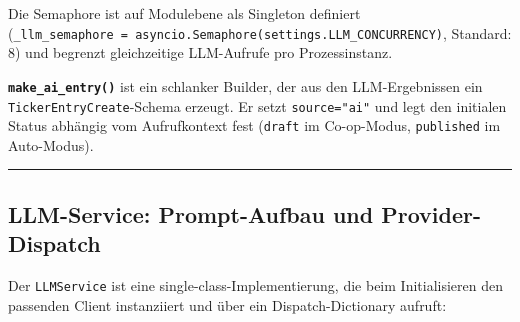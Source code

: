 \begin{Shaded}
\begin{Highlighting}[]
 
     
\OperatorTok{=}
\OperatorTok{=}
\NormalTok{    )}
\end{Highlighting}
\end{Shaded}

Die Semaphore ist auf Modulebene als Singleton definiert
(\texttt{\_llm\_semaphore\ =\ asyncio.Semaphore(settings.LLM\_CONCURRENCY)},
Standard: 8) und begrenzt gleichzeitige LLM-Aufrufe pro Prozessinstanz.

\textbf{\texttt{make\_ai\_entry()}} ist ein schlanker Builder, der aus
den LLM-Ergebnissen ein \texttt{TickerEntryCreate}-Schema erzeugt. Er
setzt \texttt{source="ai"} und legt den initialen Status abhängig vom
Aufrufkontext fest (\texttt{draft} im Co-op-Modus, \texttt{published} im
Auto-Modus).

\begin{center}\rule{0.5\linewidth}{0.5pt}\end{center}

\subsection{LLM-Service: Prompt-Aufbau und
Provider-Dispatch}\label{llm-service-prompt-aufbau-und-provider-dispatch}

Der \texttt{LLMService} ist eine single-class-Implementierung, die beim
Initialisieren den passenden Client instanziiert und über ein
Dispatch-Dictionary aufruft:

\begin{Shaded}
\begin{Highlighting}[]
\OperatorTok{=}\NormalTok{ \{}
    \NormalTok{:       }
    \NormalTok{:     }
    \NormalTok{: }
    \NormalTok{:     }
    \NormalTok{:  }
\NormalTok{\}}
\NormalTok{ dispatch[}\NormalTok{.provider](}\OperatorTok{**}
\end{Highlighting}
\end{Shaded}

